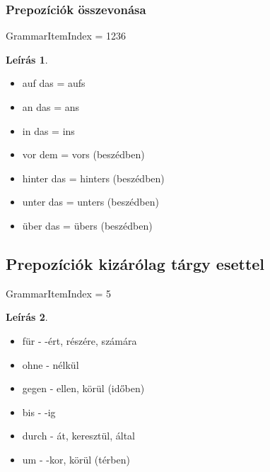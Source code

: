 \documentclass{article}
\theoremstyle{definition}
\newtheorem*{desc}{Leírás}
\begin{document}
\subsubsection{Prepozíciók összevonása}

GrammarItemIndex = 1236

\begin{desc}
\begin{itemize}
\item auf das = aufs
\item an das = ans
\item in das = ins
\item vor dem = vors (beszédben)
\item hinter das = hinters (beszédben)
\item unter das = unters (beszédben)
\item über das = übers (beszédben)
\end{itemize}
\end{desc}

\subsection{Prepozíciók kizárólag tárgy esettel}

GrammarItemIndex = 5

\begin{desc}

\begin{itemize}
\item für - -ért, részére, számára
\item ohne - nélkül
\item gegen - ellen, körül (időben)
\item bis - -ig
\item durch - át, keresztül, által
\item um - -kor, körül (térben)
\end{itemize}

\end{desc}
\end{document}
